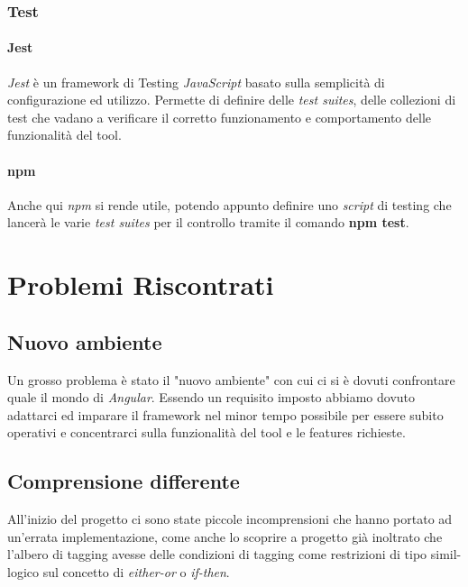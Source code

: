 \documentclass[twoside]{supsistudent}
\begin{document}
\subsection{Test}

\subsubsection{Jest}

\textit{Jest} è un framework di Testing \textit{JavaScript} basato sulla
semplicità di configurazione ed utilizzo. Permette di definire delle 
\textit{test suites}, delle collezioni di test che vadano a verificare il
corretto funzionamento e comportamento delle funzionalità del tool.

\subsubsection{npm}

Anche qui \textit{npm} si rende utile, potendo appunto definire uno
\textit{script} di testing che lancerà le varie \textit{test suites} per il
controllo tramite il comando \textbf{npm test}.

\chapter{Problemi Riscontrati}

\section{Nuovo ambiente}

Un grosso problema è stato il "nuovo ambiente" con cui ci si è dovuti 
confrontare quale il mondo di \textit{Angular}. Essendo un requisito imposto
abbiamo dovuto adattarci ed imparare il framework nel minor tempo possibile
per essere subito operativi e concentrarci sulla funzionalità del tool e le
features richieste.

\section{Comprensione differente}

All'inizio del progetto ci sono state piccole incomprensioni che hanno portato
ad un'errata implementazione, come anche lo scoprire a progetto già inoltrato
che l'albero di tagging avesse delle condizioni di tagging come restrizioni
di tipo simil-logico sul concetto di \textit{either-or} o \textit{if-then}.
\end{document}
